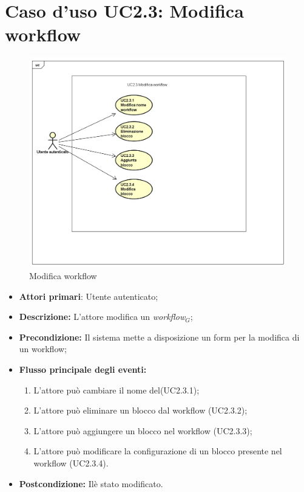 \section{Caso d'uso UC2.3: Modifica workflow}
\begin{figure} [h]
	\centering
	\includegraphics[scale=0.4]{./Diagram/UC2-3.png}
	\caption{Modifica workflow }\label{}
\end{figure}
\begin{itemize}
	\item \textbf{Attori primari}: Utente autenticato;
	\item \textbf{Descrizione:} L'attore modifica un \textit{workflow$_{G}$};
	\item \textbf{Precondizione:} Il sistema mette a disposizione un form per la modifica di un workflow;
	\item \textbf{Flusso principale degli eventi:}
	\begin{enumerate}
		\item L'attore può cambiare il nome del(UC2.3.1);
		\item L'attore può eliminare un blocco dal workflow (UC2.3.2);
		\item L'attore può aggiungere un blocco nel workflow (UC2.3.3);
		\item L'attore può modificare la configurazione di un blocco presente nel workflow (UC2.3.4).
	\end{enumerate}
	\item \textbf{Postcondizione:} Ilè stato modificato.
\end{itemize}
